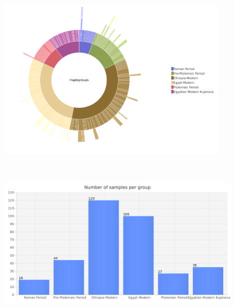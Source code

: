 \documentclass[a0paper,portrait, fontscale=0.285]{baposter}
\begin{document}
\begin{poster}
{\vspace{1em}

\begin{minipage}[t]{0.5\textwidth}
\textbf{}\\
		\includegraphics[width=0.85\textwidth, center]{figures/sunburst2.png}
\end{minipage}
\hspace{0.5em}
\begin{minipage}[t]{0.5\textwidth}
\textbf{}\\
\\
		\includegraphics[width=0.9\textwidth, left]{figures/group_sizes.png}
\end{minipage}

}




\end{poster}
\end{document}

